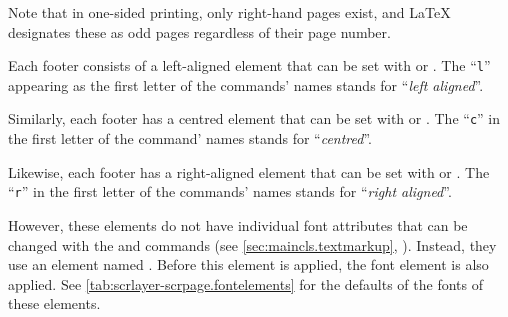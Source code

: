 Note that in one-sided printing, only right-hand pages
exist, and \LaTeX{} designates these as odd pages regardless of their page
number.

Each footer consists of a left-aligned element that can
be set with  or . The ``\texttt{l}'' appearing as
the first letter of the commands' names stands for ``\emph{left aligned}''.

Similarly, each footer has a centred element that can be set
with  or . The ``\texttt{c}'' in the first letter
of the command' names stands for ``\emph{centred}''.

Likewise, each footer has a right-aligned element that
can be set with  or . The ``\texttt{r}'' in the
first letter of the commands' names stands for ``\emph{right aligned}''.

\BeginIndexGroup
{}%
%
However, these elements do not have individual font attributes that can be
changed with the  and
 commands (see
\autoref{sec:maincls.textmarkup}, ).
Instead, they use an element named
. Before this element
is applied, the font element
 is also
applied. See \autoref{tab:scrlayer-scrpage.fontelements} for the defaults of
the fonts of these elements.%
\EndIndexGroup

